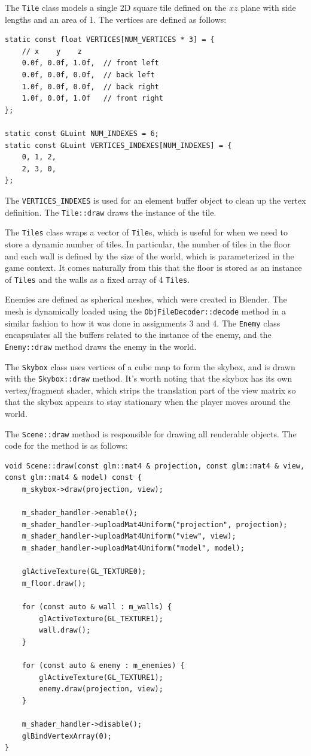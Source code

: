 \documentclass {article}
\begin{document}
The \texttt{Tile} class models a single 2D square tile defined on the $xz$ plane with side lengths and an area of 1. The vertices are defined as follows:
\begin{verbatim}
static const float VERTICES[NUM_VERTICES * 3] = {
    // x    y    z
    0.0f, 0.0f, 1.0f,  // front left
    0.0f, 0.0f, 0.0f,  // back left
    1.0f, 0.0f, 0.0f,  // back right
    1.0f, 0.0f, 1.0f   // front right
};

static const GLuint NUM_INDEXES = 6;
static const GLuint VERTICES_INDEXES[NUM_INDEXES] = {
    0, 1, 2,
    2, 3, 0,
};
\end{verbatim}

The \texttt{VERTICES\_INDEXES} is used for an element buffer object to clean up the vertex definition. The \texttt{Tile::draw} draws the instance of the tile.

The \texttt{Tiles} class wraps a vector of \texttt{Tile}s, which is useful for when we need to store a dynamic number of tiles. In particular, the number of tiles in the floor and each wall is defined by the size of the world, which is parameterized in the game context. It comes naturally from this that the floor is stored as an instance of \texttt{Tiles} and the walls as a fixed array of 4 \texttt{Tiles}.

Enemies are defined as spherical meshes, which were created in Blender. The mesh is dynamically loaded using the \texttt{ObjFileDecoder::decode} method in a similar fashion to how it was done in assignments 3 and 4. The \texttt{Enemy} class encapsulates all the buffers related to the instance of the enemy, and the \texttt{Enemy::draw} method draws the enemy in the world.

The \texttt{Skybox} class uses vertices of a cube map to form the skybox, and is drawn with the \texttt{Skybox::draw} method. It's worth noting that the skybox has its own vertex/fragment shader, which strips the translation part of the view matrix so that the skybox appears to stay stationary when the player moves around the world.

The \texttt{Scene::draw} method is responsible for drawing all renderable objects. The code for the method is as follows:
\begin{verbatim}
void Scene::draw(const glm::mat4 & projection, const glm::mat4 & view, const glm::mat4 & model) const {
    m_skybox->draw(projection, view);

    m_shader_handler->enable();
    m_shader_handler->uploadMat4Uniform("projection", projection);
    m_shader_handler->uploadMat4Uniform("view", view);
    m_shader_handler->uploadMat4Uniform("model", model);

    glActiveTexture(GL_TEXTURE0);
    m_floor.draw();

    for (const auto & wall : m_walls) {
        glActiveTexture(GL_TEXTURE1);
        wall.draw();
    }

    for (const auto & enemy : m_enemies) {
        glActiveTexture(GL_TEXTURE1);
        enemy.draw(projection, view);
    }

    m_shader_handler->disable();
    glBindVertexArray(0);
}
\end{verbatim}
\end{document}
